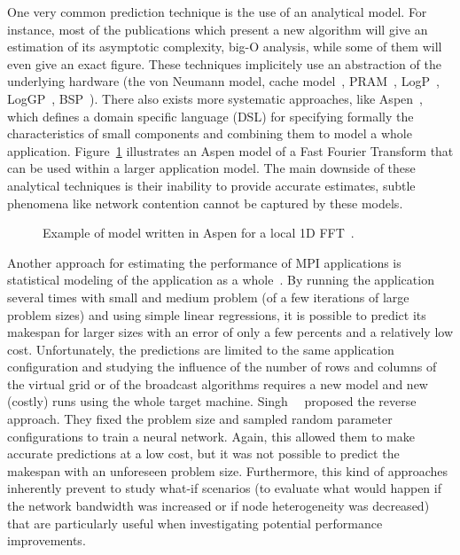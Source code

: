         One very common prediction technique is the use of an analytical model. For instance, most of the publications
        which present a new algorithm will give an estimation of its asymptotic complexity, \aka big-O analysis, while
        some of them will even give an exact figure. These techniques implicitely use an abstraction of the underlying
        hardware (\eg the von Neumann model, cache model~\cite{cache_oblivious}, PRAM~\cite{pram}, LogP~\cite{logp},
        LogGP~\cite{loggp}, BSP~\cite{bsp}). There also exists more systematic approaches, like Aspen~\cite{aspen},
        which defines a domain specific language (DSL) for specifying formally the characteristics of small components
        and combining them to model a whole application. Figure~\ref{fig:aspen:example} illustrates an Aspen model of a
        Fast Fourier Transform that can be used within a larger application model. The main downside of these analytical
        techniques is their inability to provide accurate estimates, subtle phenomena like network contention cannot be
        captured by these models.

        \begin{figure}[htpb]
            \centering
            \begin{minipage}[b]{\linewidth}
                \lstset{frame=bt,language=C,numbers=none,escapechar=|}
                
            \end{minipage}
            \caption{Example of model written in Aspen for a local 1D FFT~\cite{aspen}.}
            \label{fig:aspen:example}
        \end{figure}

        Another approach for estimating the performance of MPI applications is statistical modeling of the application
        as a whole~\cite{hpl_prediction}.  By running the application several times with small and medium problem (of a
        few iterations of large problem sizes) and using simple linear regressions, it is possible to predict its
        makespan for larger sizes with an error of only a few percents and a relatively low cost.  Unfortunately, the
        predictions are limited to the same application configuration and studying the influence of the number of rows
        and columns of the virtual grid or of the broadcast algorithms requires a new model and new (costly) runs using
        the whole target machine.  Singh~\etal~\cite{Singh_2007} proposed the reverse approach. They fixed the problem
        size and sampled random parameter configurations to train a neural network. Again, this allowed them to make
        accurate predictions at a low cost, but it was not possible to predict the makespan with an unforeseen problem
        size. Furthermore, this kind of approaches inherently prevent to study what-if scenarios (\eg to evaluate what
        would happen if the network bandwidth was increased or if node heterogeneity was decreased) that are
        particularly useful when investigating potential performance improvements.

